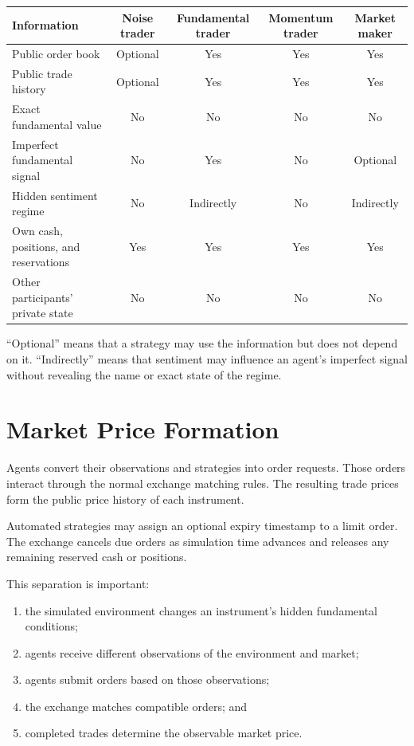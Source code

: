 \documentclass{article}
\begin{document}
\begin{center}
\small
\renewcommand{\arraystretch}{1.25}
\begin{tabular}{|>{\raggedright\arraybackslash}p{3.6cm}|c|c|c|c|}
\hline
\textbf{Information} & \textbf{Noise trader} & \textbf{Fundamental trader}
& \textbf{Momentum trader} & \textbf{Market maker} \\
\hline
Public order book & Optional & Yes & Yes & Yes \\
\hline
Public trade history & Optional & Yes & Yes & Yes \\
\hline
Exact fundamental value & No & No & No & No \\
\hline
Imperfect fundamental signal & No & Yes & No & Optional \\
\hline
Hidden sentiment regime & No & Indirectly & No & Indirectly \\
\hline
Own cash, positions, and reservations & Yes & Yes & Yes & Yes \\
\hline
Other participants' private state & No & No & No & No \\
\hline
\end{tabular}
\end{center}

``Optional'' means that a strategy may use the information but does not depend
on it. ``Indirectly'' means that sentiment may influence an agent's imperfect
signal without revealing the name or exact state of the regime.

\section{Market Price Formation}

Agents convert their observations and strategies into order requests. Those
orders interact through the normal exchange matching rules. The resulting
trade prices form the public price history of each instrument.

Automated strategies may assign an optional expiry timestamp to a limit order.
The exchange cancels due orders as simulation time advances and releases any
remaining reserved cash or positions.

This separation is important:

\begin{enumerate}
    \item the simulated environment changes an instrument's hidden fundamental
          conditions;
    \item agents receive different observations of the environment and market;
    \item agents submit orders based on those observations;
    \item the exchange matches compatible orders; and
    \item completed trades determine the observable market price.
\end{enumerate}
\end{document}
